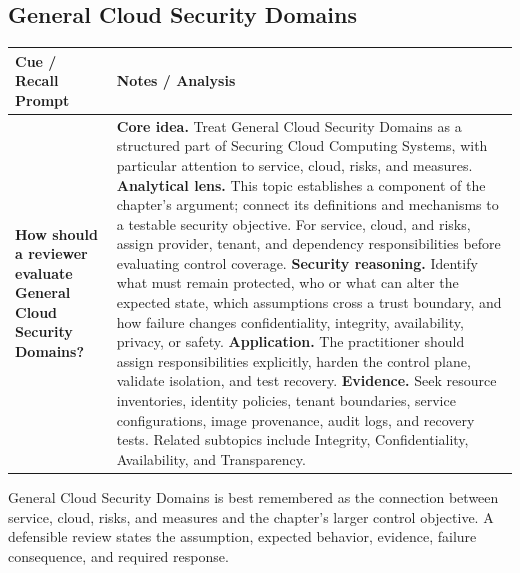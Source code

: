 \documentclass[11pt]{article}
\newcommand{\CornellHeader}{%
\rowcolor{Navy}\color{white}\bfseries Cue / Recall Prompt & \color{white}\bfseries Notes / Analysis\\\hline}
\newcommand{\CornellRow}[2]{%
\cellcolor{CueGray}\RaggedRight\textbf{#1} & \RaggedRight #2\\\hline}
\begin{document}
\subsection*{General Cloud Security Domains}
\begin{longtable}{>{\RaggedRight\arraybackslash}p{}|>{\RaggedRight\arraybackslash}p{}}
\CornellHeader
\CornellRow{How should a reviewer evaluate General Cloud Security Domains?}{\textbf{Core idea.} Treat General Cloud Security Domains as a structured part of Securing Cloud Computing Systems, with particular attention to service, cloud, risks, and measures. \textbf{Analytical lens.} This topic establishes a component of the chapter's argument; connect its definitions and mechanisms to a testable security objective. For service, cloud, and risks, assign provider, tenant, and dependency responsibilities before evaluating control coverage. \textbf{Security reasoning.} Identify what must remain protected, who or what can alter the expected state, which assumptions cross a trust boundary, and how failure changes confidentiality, integrity, availability, privacy, or safety. \textbf{Application.} The practitioner should assign responsibilities explicitly, harden the control plane, validate isolation, and test recovery. \textbf{Evidence.} Seek resource inventories, identity policies, tenant boundaries, service configurations, image provenance, audit logs, and recovery tests. Related subtopics include Integrity, Confidentiality, Availability, and Transparency.}
\end{longtable}
\begin{topicsummary}
General Cloud Security Domains is best remembered as the connection between service, cloud, risks, and measures and the chapter's larger control objective. A defensible review states the assumption, expected behavior, evidence, failure consequence, and required response.
\end{topicsummary}
\end{document}
